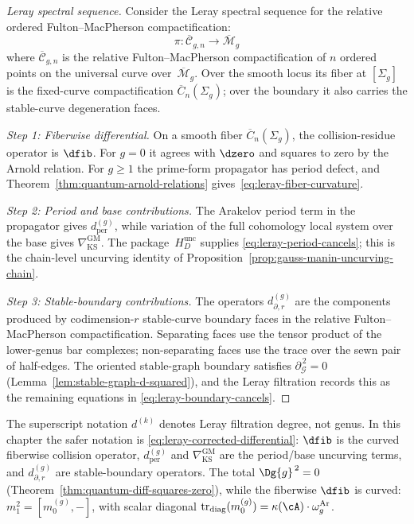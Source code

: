 \begin{proof}[Leray spectral sequence]
Consider the Leray spectral sequence for the relative ordered
Fulton--MacPherson compactification:
\begin{equation}
\pi: \overline{\mathcal{C}}_{g,n} \to \overline{\mathcal{M}}_{g}
\end{equation}
where $\overline{\mathcal{C}}_{g,n}$ is the relative
Fulton--MacPherson compactification of $n$ ordered points on the
universal curve over~$\overline{\mathcal{M}}_g$. Over the smooth
locus its fiber at $[\Sigma_g]$ is the fixed-curve compactification
$\overline{C}_n(\Sigma_g)$; over the boundary it also carries the
stable-curve degeneration faces.

\emph{Step 1: Fiberwise differential.} On a smooth fiber
$\overline C_n(\Sigma_g)$, the collision-residue operator is
$\dfib$. For $g=0$ it agrees with $\dzero$ and squares to zero by
the Arnold relation. For $g\geq1$ the prime-form propagator has
period defect, and Theorem~\ref{thm:quantum-arnold-relations}
gives~\eqref{eq:leray-fiber-curvature}.

\emph{Step 2: Period and base contributions.}
The Arakelov period term in the propagator gives
$d_{\mathrm{per}}^{(g)}$, while variation of the full cohomology local
system over the base gives $\nabla_{\mathrm{KS}}^{\mathrm{GM}}$.
The package~$H_D^{\mathrm{unc}}$ supplies
\eqref{eq:leray-period-cancels}; this is the chain-level uncurving
identity of Proposition~\ref{prop:gauss-manin-uncurving-chain}.

\emph{Step 3: Stable-boundary contributions.}
The operators $d_{\partial,r}^{(g)}$ are the components produced by
codimension-$r$ stable-curve boundary faces in the relative
Fulton--MacPherson compactification. Separating faces use the tensor
product of the lower-genus bar complexes; non-separating faces use
the trace over the sewn pair of half-edges. The oriented stable-graph
boundary satisfies $\partial_{\mathcal G}^{\,2}=0$
(Lemma~\ref{lem:stable-graph-d-squared}), and the Leray filtration
records this as the remaining equations in
\eqref{eq:leray-boundary-cancels}.
\end{proof}

\begin{remark}
\label{rem:differential-notation}
The superscript notation $d^{(k)}$ denotes Leray filtration degree,
not genus. In this chapter the safer notation is
\eqref{eq:leray-corrected-differential}: $\dfib$ is the curved
fiberwise collision operator, $d_{\mathrm{per}}^{(g)}$ and
$\nabla_{\mathrm{KS}}^{\mathrm{GM}}$ are the period/base uncurving
terms, and $d_{\partial,r}^{(g)}$ are stable-boundary operators.
The total $\Dg{g}^{\,2}=0$
(Theorem~\ref{thm:quantum-diff-squares-zero}), while the fiberwise
$\dfib$ is curved: $m_1^2=[m_0^{(g)},-]$, with scalar diagonal
$\operatorname{tr}_{\mathrm{diag}}(m_0^{(g)})
=\kappa(\cA)\cdot\omega_g^{\mathrm{Ar}}$.
\end{remark}

